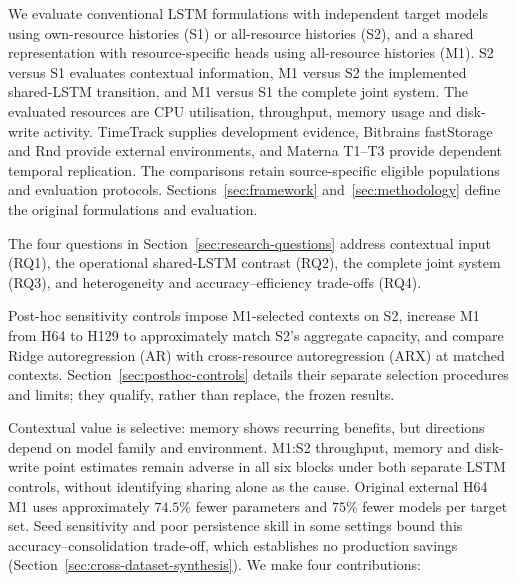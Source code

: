 \documentclass[a4paper,fleqn]{cas-dc}
\begin{document}
We evaluate conventional LSTM formulations with independent target models
using own-resource histories (S1) or all-resource histories (S2), and a shared
representation with resource-specific heads using all-resource histories
(M1). S2 versus S1 evaluates contextual information, M1 versus S2 the
implemented shared-LSTM transition, and M1 versus S1 the complete joint
system. The evaluated resources are CPU utilisation, throughput, memory usage
and disk-write activity. TimeTrack supplies development evidence, Bitbrains
fastStorage and Rnd provide external environments, and Materna T1--T3 provide
dependent temporal replication. The comparisons retain source-specific
eligible populations and evaluation protocols.
Sections~\ref{sec:framework} and~\ref{sec:methodology} define the original
formulations and evaluation.

The four questions in Section~\ref{sec:research-questions} address contextual
input (RQ1), the operational shared-LSTM contrast (RQ2), the complete joint
system (RQ3), and heterogeneity and accuracy--efficiency trade-offs (RQ4).

Post-hoc sensitivity controls impose M1-selected contexts on S2, increase M1
from H64 to H129 to approximately match S2's aggregate capacity, and compare
Ridge autoregression (AR) with cross-resource autoregression (ARX) at matched
contexts. Section~\ref{sec:posthoc-controls} details their separate selection
procedures and limits; they qualify, rather than replace, the frozen results.

Contextual value is selective: memory shows recurring benefits, but directions
depend on model family and environment. M1:S2 throughput, memory and disk-write
point estimates remain adverse in all six blocks under both separate LSTM
controls, without identifying sharing alone as the cause. Original external
H64 M1 uses approximately $74.5\%$ fewer parameters and $75\%$ fewer models per
target set. Seed sensitivity and poor persistence skill in some settings bound
this accuracy--consolidation trade-off, which establishes no production savings
(Section~\ref{sec:cross-dataset-synthesis}). We make four contributions:
\end{document}
